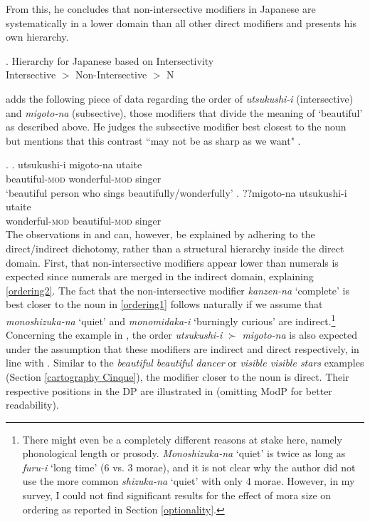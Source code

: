 From this, he concludes that non-intersective modifiers in Japanese are systematically in a lower domain than all other direct modifiers and presents his own hierarchy. 

\ex. Hierarchy for Japanese based on Intersectivity \citep{ayano:2010:revisiting}\\
Intersective $>$ Non-Intersective $>$ N

\citet{watanabe:2017:attributive} adds the following piece of data regarding the order of \textit{utsukushi-i} (intersective) and \textit{migoto-na} (subsective), those modifiers that divide the meaning of `beautiful' as described above. He judges the subsective modifier best closest to the noun but mentions that this contrast ``may not be as sharp as we want" \citep[790]{watanabe:2017:attributive}.

\ex. \ag. utsukushi-i migoto-na utaite\\
beautiful-\textsc{mod} wonderful-\textsc{mod} singer\\
`beautiful person who sings beautifully/wonderfully' \label{utsukushi-i migoto-na utaite}
\bg. ??migoto-na utsukushi-i utaite\\
wonderful-\textsc{mod} beautiful-\textsc{mod} singer \null \hfill \citep[790]{watanabe:2017:attributive} \\

The observations in \citet{ayano:2010:revisiting} and \citet{watanabe:2017:attributive} can, however, be explained by adhering to the direct/indirect dichotomy, rather than a structural hierarchy inside the direct domain. First, that non-intersective modifiers appear lower than numerals is expected since numerals are merged in the indirect domain, explaining \ref{ordering2}. The fact that the non-intersective modifier \textit{kanzen-na} `complete’ is best closer to the noun in \ref{ordering1} follows naturally if we assume that \textit{monoshizuka-na} `quiet’ and \textit{monomidaka-i} `burningly curious’ are indirect.\footnote{There might even be a completely different reasons at stake here, namely phonological length or prosody. \textit{Monoshizuka-na} `quiet' is twice as long as \textit{furu-i} `long time' (6 vs. 3 morae), and it is not clear why the author did not use the more common \textit{shizuka-na} `quiet' with only 4 morae. However, in my survey, I could not find significant results for the effect of mora size on ordering as reported in Section \ref{optionality}.} Concerning the example in \citet{watanabe:2017:attributive}, the order \textit{utsukushi-i} $\succ$ \textit{migoto-na} is also expected under the assumption that these modifiers are indirect and direct respectively, in line with \citet[22–24]{cinque:2010:adj}. Similar to the \textit{beautiful beautiful dancer} or \textit{visible visible stars} examples (Section \ref{cartography Cinque}), the modifier closer to the noun is direct. Their respective positions in the DP are illustrated in  (omitting ModP for better readability).


